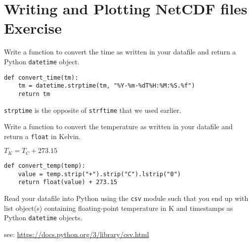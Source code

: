 \documentclass[a4paper,11pt]{article}
\begin{document}
\section{Writing and Plotting NetCDF files Exercise}
\begin{question}
Write a function to convert the time as written in
your datafile and return a Python \texttt{datetime}
object.
\end{question}
\newsavebox\timeconv
\begin{lrbox}{\timeconv}
\begin{minipage}{\textwidth}
\begin{verbatim}
def convert_time(tm):
    tm = datetime.strptime(tm, "%Y-%m-%dT%H:%M:%S.%f")
    return tm
\end{verbatim}
\end{minipage}
\end{lrbox}
\begin{solution}
\noindent\usebox\timeconv

\texttt{strptime} is the opposite of \texttt{strftime} that we used earlier.
\end{solution}
\begin{question}
Write a function to convert the temperature as
written in your datafile and return a \texttt{float} in
Kelvin.

{\center $T_K = T_C + 273.15$}
\end{question}
\newsavebox\tempconv
\begin{lrbox}{\tempconv}
\begin{minipage}{\textwidth}
\begin{verbatim}
def convert_temp(temp):
    value = temp.strip("+").strip("C").lstrip("0")
    return float(value) + 273.15
\end{verbatim}
\end{minipage}
\end{lrbox}
\begin{solution}
\noindent\usebox\tempconv
\end{solution}
\begin{question}
Read your datafile into Python using the \texttt{csv} module such
that you end up with list object(s) containing floating-point
temperature in K and timestamps as Python \texttt{datetime} objects.


see: \url{https://docs.python.org/3/library/csv.html}
\end{question}
\newsavebox\csvread
\end{document}
